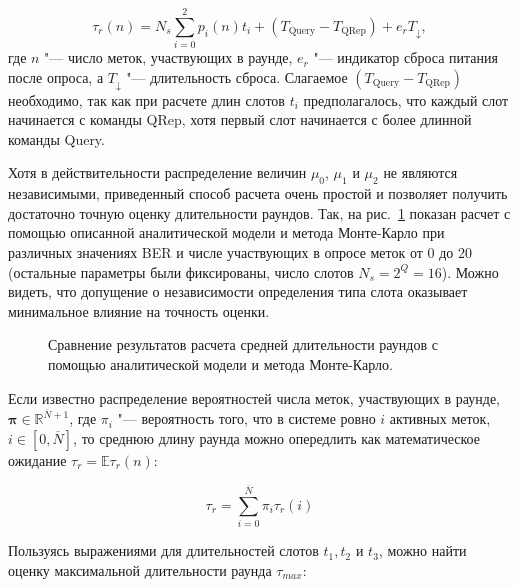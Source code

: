\begin{equation}\label{eq:ch3_round_duration_of_n}
	\tau_r(n) = N_s \sum\limits_{i=0}^{2}p_i(n)t_i +
		(T_\text{Query} - T_\text{QRep}) +
		e_r T_\downarrow,
\end{equation}
где $n$ "--- число меток, участвующих в раунде, $e_r$ "--- индикатор сброса питания после опроса, а $T_\downarrow$ "--- длительность сброса. Слагаемое $(T_\text{Query} - T_\text{QRep})$ необходимо, так как при расчете длин слотов $t_i$ предполагалось, что каждый слот начинается с команды QRep, хотя первый слот начинается с более длинной команды Query.

Хотя в действительности распределение величин $\mu_0$, $\mu_1$ и $\mu_2$ не являются независимыми, приведенный способ расчета очень простой и позволяет получить достаточно точную оценку длительности раундов. Так, на рис.~\ref{fig:ch3_round_durations_validation} показан расчет с помощью описанной аналитической модели и метода Монте-Карло при различных значениях BER и числе участвующих в опросе меток от 0 до 20 (остальные параметры были фиксированы, число слотов $N_s = 2^Q = 16$). Можно видеть, что допущение о независимости определения типа слота оказывает минимальное влияние на точность оценки.

\begin{figure}[htb]
  \caption[Валидация модели расчета средрней длительности раундов.]{Сравнение результатов расчета средней длительности раундов с помощью аналитической модели и метода Монте-Карло.}
  \label{fig:ch3_round_durations_validation}
\end{figure}


Если известно распределение вероятностей числа меток, участвующих в раунде, $\bm{\pi} \in \mathbb{R}^{\overline{N}+1}$, где $\pi_i$ "--- вероятность того, что в системе ровно $i$ активных меток, $i \in [0, \overline{N}]$, то среднюю длину раунда можно опередлить как математическое ожидание $\tau_r = \mathbb{E} \tau_r(n)$:

\begin{equation}\label{eq:ch3_round_duration_avg}
	\tau_r = \sum\limits_{i=0}^{\overline{N}} \pi_i \tau_r(i)
\end{equation}

Пользуясь выражениями для длительностей слотов $t_1, t_2$ и $t_3$, можно найти оценку максимальной длительности раунда $\tau_{max}$:

